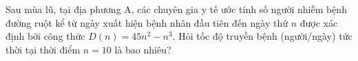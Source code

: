 \begin{baitap}
	Sau mùa lũ, tại địa phương A, các chuyên gia y tế ước tính số người nhiễm bệnh đường ruột kể từ ngày xuất hiện bệnh nhân đầu tiên đến ngày thứ $n$ được xác định bởi công thức $D(n)=45n^2-n^3$. Hỏi tốc độ truyền bệnh (người/ngày) tức thời tại thời điểm $n=10$ là bao nhiêu?
\end{baitap}